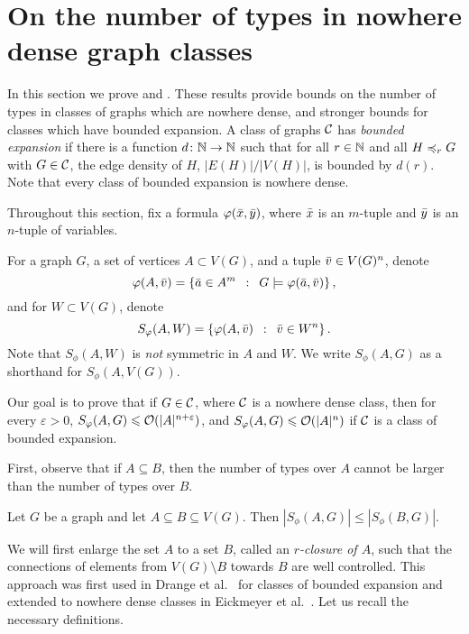 \section{On the number of types in nowhere dense graph classes}

In this section we prove  and .
	These results provide bounds on the number of types in classes of graphs which are nowhere dense, 
	and stronger bounds for classes which have bounded expansion. 
A class of graphs $\mathcal{C}$ has \emph{bounded expansion}
	if there is a function $d\colon\mathbb{N}\rightarrow\mathbb{N}$ such that for all 
	$r\in \mathbb{N}$ and all $H\preccurlyeq_rG$ with $G\in\mathcal{C}$, the edge density
	of $H$, $|E(H)|/|V(H)|$, is bounded by $d(r)$. Note that every 
	class of bounded expansion is nowhere dense.
	
Throughout this section, fix a formula  $\varphi(\bar{x},\bar{y})$, where
$\bar{x}$ is an $m$-tuple and $\bar{y}$ is an $n$-tuple of variables.

For a graph $G$, a set of  vertices $A\subset V(G)$, and a tuple $\bar{v}\in V(G)^n$,
denote
\[\varphi(A,\bar{v})=\left\{\bar{a} \in A^m  \,~:~\,  G\models\varphi(\bar{a},\bar{v}) \right\},\]
and for $W\subset V(G)$, denote
\[S_\varphi(A,W)=\left\{\varphi(A,\bar{v}) \,~:~\,  \bar{v}\in W^n \right\}.\]
Note that $S_\phi(A,W)$ is \emph{not} symmetric in $A$ and $W$.
We write $S_\phi(A,G)$ as a shorthand for $S_\phi(A,V(G))$.

Our goal is to prove that if $G\in \mathcal{C}$, where $\mathcal{C}$ is a nowhere dense class,
then for every $\varepsilon>0$,   $S_\varphi(A,G)\leqslant \mathcal{O}(|A|^{n+\varepsilon})$, and 
$S_\varphi(A,G)\leqslant \mathcal{O}(|A|^n)$ if $\mathcal{C}$ is a class of bounded expansion.


First, observe that if $A\subseteq B$, then the number of types
over $A$ cannot be larger than the number of types over $B$. 

\begin{lemma}\label{lem:types-over-B}
Let $G$ be a graph and let $A\subseteq B\subseteq V(G)$. Then 
$|S_\phi(A,G)|\leq |S_\phi(B,G)|$. 
\end{lemma}

We will first enlarge the set $A$ to a set $B$, called
an \emph{$r$-closure of $A$}, such 
that the connections of elements from $V(G)\setminus B$ 
towards $B$ are well controlled. This approach
was first used in Drange et al.~\cite{drange2016kernelization} for
classes of bounded expansion and extended to nowhere dense
classes in Eickmeyer et al.~\cite{eickmeyer2016neighborhood}. 
Let us recall the necessary definitions.

